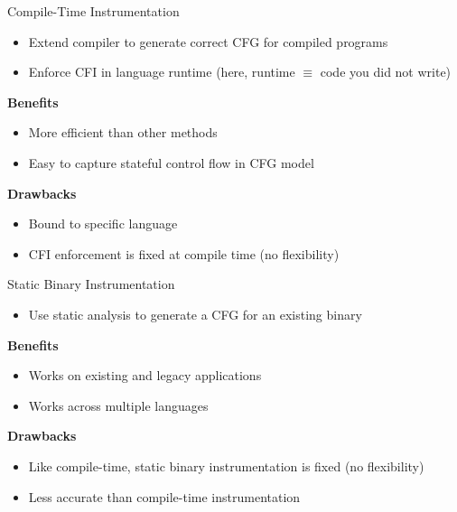 \documentclass[12pt, dvipsnames, aspectratio=169]{beamer}
\newcommand{\red}[1]{{\color{red}#1}}
\newcommand{\blue}[1]{{\color{blue}#1}}
\begin{document}

\begin{frame}[c]{Compile-Time Instrumentation}{}
  \begin{itemize}
    \item Extend compiler to generate correct CFG for compiled programs
    \item Enforce CFI in language runtime (here, runtime $\equiv$ code you did not write)
  \end{itemize}

  \vfill
  {\bf \blue{Benefits}}
  \begin{itemize}
    \item More efficient than other methods
    \item Easy to capture stateful control flow in CFG model
  \end{itemize}

  \vfill
  {\bf \red{Drawbacks}}
  \begin{itemize}
    \item Bound to specific language
    \item CFI enforcement is fixed at compile time (no flexibility)
  \end{itemize}
\end{frame}

\begin{frame}[c]{Static Binary Instrumentation}{}
  \begin{itemize}
    \item Use static analysis to generate a CFG for an existing binary
  \end{itemize}

  \vfill
  {\bf \blue{Benefits}}
  \begin{itemize}
    \item Works on existing and legacy applications
    \item Works across multiple languages
  \end{itemize}

  \vfill
  {\bf \red{Drawbacks}}
  \begin{itemize}
    \item Like compile-time, static binary instrumentation is fixed (no flexibility)
    \item Less accurate than compile-time instrumentation
  \end{itemize}
\end{frame}
\end{document}
